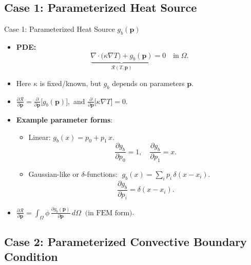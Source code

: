 \documentclass[10pt,aspectratio=169]{beamer}
\begin{document}
\subsection{Case 1: Parameterized Heat Source}

\begin{frame}{Case 1: Parameterized Heat Source \(g_b(\mathbf{p})\)}
\small
\begin{itemize}
    \item \textbf{PDE:}
      \[
        \underbrace{
        \nabla \cdot \bigl(\kappa\nabla T\bigr)
        + g_b(\mathbf{p})
        }_{\mathcal{R}(T,\mathbf{p})}
        = 0
        \quad\text{in}\;\Omega.
      \]
    \item Here \(\kappa\) is fixed/known, but \(g_b\) depends on parameters \(\mathbf{p}\).
    \item \(\displaystyle
       \frac{\partial \mathcal{R}}{\partial \mathbf{p}}
       = \frac{\partial}{\partial \mathbf{p}}
         \bigl[g_b(\mathbf{p})\bigr],
      \)
      and \(\frac{\partial}{\partial \mathbf{p}}\bigl[\kappa\nabla T\bigr] = 0\).
    \item \textbf{Example parameter forms}:
      \begin{itemize}
         \item Linear: \(g_b(x) = p_0 + p_1\,x.\)
           \[
             \frac{\partial g_b}{\partial p_0} = 1, 
             \quad
             \frac{\partial g_b}{\partial p_1} = x.
           \]
         \item Gaussian-like or \(\delta\)-functions: 
           \(\;g_b(x) = \sum_{i}p_i\,\delta(x-x_i).\)
           \[
             \frac{\partial g_b}{\partial p_i}
             = \delta(x - x_i).
           \]
      \end{itemize}
    \item \(\boxed{\frac{\partial \mathcal{R}}{\partial \mathbf{p}}
           = 
           \int_{\Omega}
             \phi\,
             \frac{\partial g_b(\mathbf{p})}{\partial \mathbf{p}}
           \,d\Omega 
           \;\;\text{(in FEM form)}}\).
\end{itemize}
\end{frame}


\subsection{Case 2: Parameterized Convective Boundary Condition}
\end{document}

